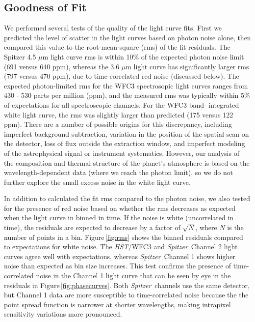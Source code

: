 \documentclass[twocolumn]{aastex61}
\newcommand{\project}[1]{\textsl{#1}}
\newcommand{\HST}{\project{HST}}
\newcommand{\Spitzer}{\project{Spitzer}}
\begin{document}
\subsection{Goodness of Fit}
\label{sec:fitquality}
We performed several tests of the quality of the light curve fits.  First we predicted the level of scatter in the light curves based on photon noise alone, then compared this value to the root-mean-square (rms) of the fit residuals.  The Spitzer 4.5 $\mu$m light curve rms is within 10\% of the expected photon noise limit (691 versus 640 ppm), whereas the 3.6 $\mu$m light curve has significantly larger rms (797 versus 470 ppm), due to time-correlated red noise (discussed below). The expected photon-limited rms for the WFC3 spectrosopic light curves ranges from 430 - 530 parts per million (ppm), and the measured rms was typically within 5\% of expectations for all spectroscopic channels.  For the WFC3 band- integrated white light curve, the rms was slightly larger than predicted (175 versus 122 ppm). There are a number of possible origins for this discrepancy, including imperfect background subtraction, variation in the position of the spatial scan on the detector, loss of flux outside the extraction window, and imperfect modeling of the astrophysical signal or instrument systematics. However, our analysis of the composition and thermal structure of the planet's atmosphere is based on the wavelength-dependent data (where we reach the photon limit), so we do not further explore the small excess noise in the white light curve. 


In addition to calculated the fit rms compared to the photon noise, we also tested for the presence of red noise based on whether the rms decreases as expected when the light curve in binned in time.  If the noise is white (uncorrelated in time), the residuals are expected to decrease by a factor of $\sqrt{N}$, where $N$ is the number of points in a bin. Figure\,\ref{fig:rms} shows the binned residuals compared to expectations for white noise. The \HST/WFC3 and \Spitzer\ Channel 2 light curves agree well with expectations, whereas \Spitzer\ Channel 1 shows higher noise than expected as bin size increases. This test confirms the presence of time-correlated noise in the Channel 1 light curve that can be seen by eye in the residuals in Figure\,\ref{fig:phasecurves}. Both \Spitzer\ channels use the same detector, but Channel 1 data are more susceptible to time-correlated noise because the the point spread function is narrower at shorter wavelengths, making intrapixel sensitivity variations more pronounced.
\end{document}
